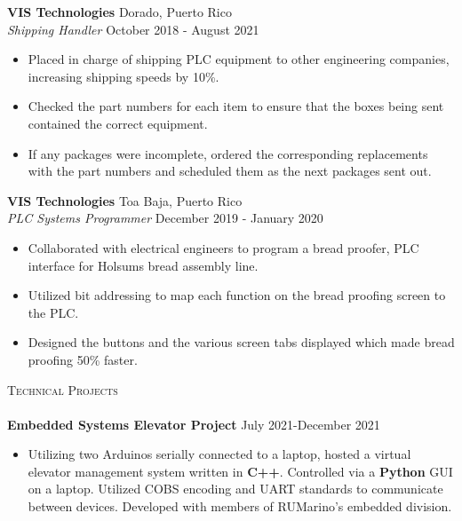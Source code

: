 \documentclass[a4paper]{article}
\newcommand{\lineunder} {
    \vspace*{-8pt} \\
    \hspace*{-18pt} \hrulefill \\
}
\newcommand{\header} [1] {
    {\hspace*{-18pt}\vspace*{6pt} \textsc{#1}}
    \vspace*{-6pt} \lineunder
}
\begin{document}
\textbf{VIS Technologies} \hfill Dorado, Puerto Rico\\
\textit{Shipping Handler} \hfill October 2018 - August 2021\\
\vspace{-2mm}

\begin{itemize} \itemsep -1pt
	\item Placed in charge of shipping PLC equipment to other engineering companies, increasing shipping speeds by 10\%.
	\item Checked the part numbers for each item to ensure that the boxes being sent contained the correct equipment.
	\item If any packages were incomplete, ordered the corresponding replacements with the part numbers and scheduled them as the next packages sent out.
\end{itemize}

\textbf{VIS Technologies} \hfill Toa Baja, Puerto Rico\\
\textit{PLC Systems Programmer} \hfill December 2019 - January 2020\\
\vspace{-2mm}
\begin{itemize} \itemsep -1pt
	\item Collaborated with electrical engineers to program a bread proofer, PLC interface for Holsum\textquotesingle{}s bread assembly line.
	\item Utilized bit addressing to map each function on the bread proofing screen to the PLC.
	\item Designed the buttons and the various screen tabs displayed which made bread proofing 50\% faster.
\end{itemize}

\header{Technical Projects}
{\textbf{Embedded Systems Elevator Project}} \hfill \hfill July 2021-December 2021\\
\vspace{-1mm}

\begin{itemize} \itemsep -1pt
\item Utilizing two Arduinos serially connected to a laptop, hosted a virtual elevator management system written in \textbf{C++}. Controlled via a \textbf{Python} GUI on a laptop. Utilized COBS encoding and UART standards to communicate between devices. Developed with members of RUMarino's embedded division.\\
\vspace*{-1mm}
\end{itemize}
\end{document}
